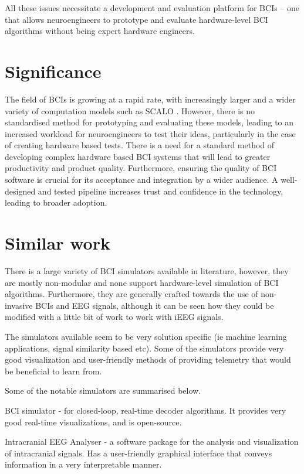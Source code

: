 \documentclass[twocolumn]{article}
\begin{document}
All these issues necessitate a development and evaluation platform for BCIs -- one that allows neuroengineers to prototype and evaluate hardware-level BCI algorithms without being expert hardware engineers.

\section{Significance}

The field of BCIs is growing at a rapid rate, with increasingly larger and a wider variety of computation models such as SCALO \cite{10.1145/3579371.3589107}. However, there is no standardised method for prototyping and evaluating these models, leading to an increased workload for neuroengineers to test their ideas, particularly in the case of creating hardware based tests. There is a need for a standard method of developing complex hardware based BCI systems that will lead to greater productivity and product quality. Furthermore, ensuring the quality of BCI software is crucial for its acceptance and integration by a wider audience. A well-designed and tested pipeline increases trust and confidence in the technology, leading to broader adoption.


\section{Similar work}

There is a large variety of BCI simulators available in literature, however, they are mostly non-modular and none support hardware-level simulation of BCI algorithms. Furthermore, they are generally crafted towards the use of non-invasive BCIs and EEG signals, although it can be seen how they could be modified with a little bit of work to work with iEEG signals.

The simulators available seem to be very solution specific (ie machine learning applications, signal similarity based etc). Some of the simulators provide very good visualization and user-friendly methods of providing telemetry that would be beneficial to learn from.

Some of the notable simulators are summarised below.

BCI simulator \cite{bci-sim-github} - for closed-loop, real-time decoder algorithms. It provides very good real-time visualizations, and is open-source.

Intracranial EEG Analyser \cite{DUBARRY2022119251} - a software package for the analysis and visualization of intracranial signals. Has a user-friendly graphical interface that conveys information in a very interpretable manner.
\end{document}
